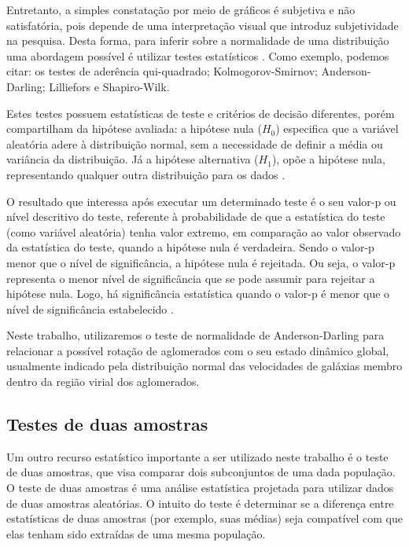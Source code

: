 Entretanto, a simples constatação por meio de gráficos é subjetiva e não satisfatória, pois depende de uma interpretação visual que introduz  subjetividade na pesquisa. Desta forma, para inferir sobre a normalidade de uma distribuição uma abordagem possível é utilizar  testes estatísticos \cite{cirillo2003extensao}.  Como exemplo, podemos citar: os testes de aderência qui-quadrado; Kolmogorov-Smirnov; Anderson-Darling; Lilliefors e Shapiro-Wilk. 

Estes testes possuem estatísticas de teste e critérios de decisão diferentes, porém compartilham da hipótese avaliada: a hipótese nula ($H_0$) especifica que a variável aleatória adere à distribuição normal, sem a necessidade de definir a média ou variância da distribuição. Já a hipótese alternativa ($H_1$), opõe a hipótese nula, representando qualquer outra distribuição para os dados \cite{leotti2012normalidade}.

O resultado que interessa após executar um determinado teste é o seu valor-p ou nível descritivo do teste, referente à probabilidade de que a estatística do teste (como variável aleatória) tenha valor extremo, em comparação ao valor observado da estatística do teste, quando a hipótese nula é verdadeira. Sendo o valor-p menor que o nível de significância, a hipótese nula é rejeitada. Ou seja, o valor-p representa o menor nível de significância que se pode assumir para rejeitar a hipótese nula. Logo, há significância estatística quando o valor-p é menor que o nível de significância estabelecido \cite{FLAVIO2012}. 
 
Neste trabalho, utilizaremos o teste de normalidade de Anderson-Darling para relacionar a possível rotação de aglomerados com o
seu estado dinâmico global, usualmente indicado pela distribuição normal das velocidades de galáxias membro dentro
da região virial dos aglomerados.

\subsection{Testes de duas amostras}

Um outro recurso estatístico importante a ser utilizado neste trabalho é o teste de duas amostras, que visa
comparar dois subconjuntos de uma dada população.
O teste de duas amostras é uma análise estatística projetada para utilizar dados de duas amostras aleatórias. O intuito do teste é determinar se a diferença entre estatísticas de duas amostras (por exemplo, suas médias) seja compatível com que elas tenham sido extraídas de uma mesma população.


